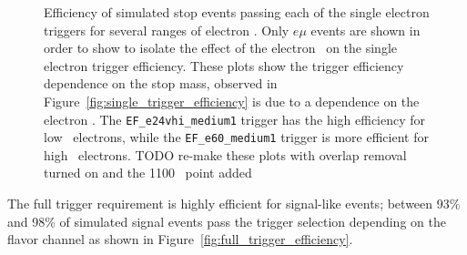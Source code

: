 \begin{figure}[ht]
  \centering
  \caption{Efficiency of simulated stop events passing each of the single
    electron triggers for several ranges of electron \ET.
    Only $e\mu$ events are shown in order to show to isolate the effect of
    the electron \ET\ on the single electron trigger efficiency.
    These plots show the trigger efficiency dependence on the stop mass,
    observed in Figure~\ref{fig:single_trigger_efficiency} is due to a
    dependence on the electron \HT.
    The \texttt{EF\_e24vhi\_medium1} trigger has the high efficiency for low
    \HT\ electrons, while the \texttt{EF\_e60\_medium1} trigger is more
    efficient for high \HT\ electrons.
    {\color{red} TODO re-make these plots with overlap removal turned on and
    the 1100 \GeV\ point added}
  }
  \label{fig:electron_trigger_pt_dependence}
\end{figure}

The full trigger requirement is highly efficient for signal-like events; between
93\% and 98\% of simulated signal events pass the trigger selection depending
on the flavor channel as shown in Figure~\ref{fig:full_trigger_efficiency}.

